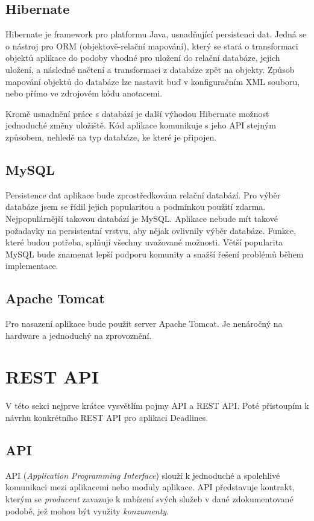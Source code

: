 \documentclass[thesis=B,czech]{FITthesis}[2012/06/26]
\begin{document}
		\subsection{Hibernate}
			Hibernate \cite{hibernate} je framework pro platformu Java, usnadňující persistenci dat. Jedná se o nástroj pro ORM (objektově-relační mapování), který se stará o transformaci objektů aplikace do podoby vhodné pro uložení do relační databáze, jejich uložení, a následné načtení a transformaci z databáze zpět na objekty. Způsob mapování objektů do databáze lze nastavit buď v konfiguračním XML souboru, nebo přímo ve zdrojovém kódu anotacemi.
			
			Kromě usnadnění práce s databází je další výhodou Hibernate možnost jednoduché změny uložiště. Kód aplikace komunikuje s jeho API stejným způsobem, nehledě na typ databáze, ke které je připojen.
		
		\subsection{MySQL}
			Persistence dat aplikace bude zprostředkována relační databází. Pro výběr databáze jsem se řídil jejich popularitou a podmínkou použití zdarma. Nejpopulárnější takovou databází je MySQL. \cite{db-ranking} Aplikace nebude mít takové požadavky na persistentní vrstvu, aby nějak ovlivnily výběr databáze. Funkce, které budou potřeba, splňují všechny uvažované možnosti. Větší popularita MySQL bude znamenat lepší podporu komunity a snažší řešení problémů během implementace.
			
		\subsection{Apache Tomcat}
			Pro nasazení aplikace bude použit server Apache Tomcat. \cite{tomcat} Je nenáročný na hardware a jednoduchý na zprovoznění. 
		
	
	\section{REST API}
		V této sekci nejprve krátce vysvětlím pojmy API a REST API. Poté přistoupím k návrhu konkrétního REST API pro aplikaci Deadlines.
	
		\subsection{API}
			API (\textit{Application Programming Interface}) slouží k jednoduché a spolehlivé komunikaci mezi aplikacemi nebo moduly aplikace. API představuje kontrakt, kterým se \textit{producent} zavazuje k nabízení svých služeb v dané zdokumentované podobě, jež mohou být využity \textit{konzumenty}.
			
\end{document}
